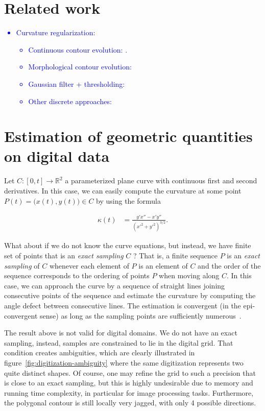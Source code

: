 \documentclass[smallextended]{svjour3}
\newcommand{\todo}[1]{{\textcolor{blue}{#1}}}
\begin{document}
\section{Related work}
\todo{
\begin{itemize}
\item{Curvature regularization:
\begin{itemize}
\item{Continuous contour evolution: \cite{kass1988snakes}
\cite{chan01}.}
\item{Morphological contour evolution: \cite{marquezneila14} }
\item{Gaussian filter + thresholding: \cite{merriman1992diffusion} }
\item{Other discrete approaches: \cite{schoenemann09linear} 
\cite{zehiry10fast}
\cite{nieuwenhuis14efficient} \cite{antunes19} \cite{antunes20}}
\end{itemize}}
\end{itemize}}
%
%
\section{Estimation of geometric quantities on digital data}

Let $C:[0,t] \rightarrow \mathbb{R}^2$ a parameterized plane curve with continuous first and second derivatives. In this case, we can easily compute the curvature at some point $P(t) = \big( x(t),y(t) \big) \in C$ by using the formula

\begin{align*}
\kappa (t) &= \frac{y'x'' -x'y''}{(x'^2 + y'^2)^{3/2}}.
\end{align*}

What about if we do not know the curve equations, but instead, we have finite set of points that is an \emph{exact sampling} $C$ ? That is, a finite sequence $P$ is an {\em exact sampling} of $C$ whenever each element of $P$ is an element of $C$ and the order of the sequence corresponds to the ordering of points $P$ when moving along $C$. In this case, we can approach the curve by a sequence of straight lines joining consecutive points of the sequence and estimate the curvature by computing the angle defect between consecutive lines. The estimation is convergent (in the epi-convergent sense) as long as the sampling points are sufficiently numerous~\cite{bruckstein01discrete,bruckstein01convergence}.

The result above is not valid for digital domains. We do not have an exact sampling, instead, samples are constrained to lie in the digital grid. That condition creates ambiguities, which are clearly illustrated in figure~\ref{fig:digitization-ambiguity} where the same digitization represents two quite distinct shapes. Of course, one may refine the grid to such a precision that is close to an exact sampling, but this is highly undesirable due to memory and running time complexity, in particular for image processing tasks. Furthermore, the polygonal contour is still locally very jagged, with only 4 possible directions.
\end{document}
